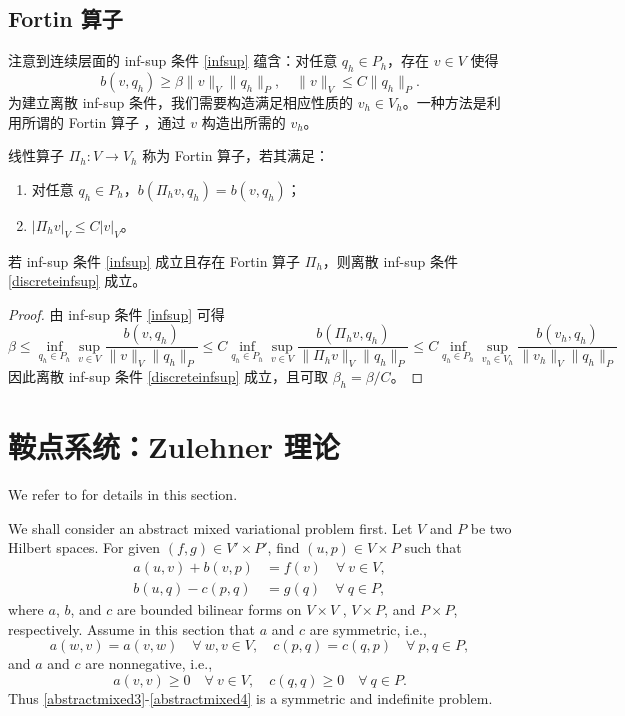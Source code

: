 \subsection{Fortin 算子}
注意到连续层面的 inf-sup 条件 \eqref{infsup} 蕴含：对任意 $q_h\in P_h$，存在 $v \in V$ 使得
$$
b(v, q_h)\geq\beta\|v\|_V\|q_h\|_P, \quad \|v\|_V\leq C\|q_h\|_P.
$$
为建立离散 inf-sup 条件，我们需要构造满足相应性质的 $v_h\in V_h$。一种方法是利用所谓的 Fortin 算子 \cite{Fortin1977}，通过 $v$ 构造出所需的 $v_h$。

\begin{definition}[Fortin 算子]
线性算子 $\Pi_h: V\to V_h$ 称为 Fortin 算子，若其满足：
\begin{enumerate}
\item 对任意 $q_h\in P_h$，$b(\Pi_hv, q_h) = b(v, q_h)$；
\item $|\Pi_hv|_V\leq C|v|_V$。
\end{enumerate}
\end{definition}

\begin{theorem}
若 inf-sup 条件 \eqref{infsup} 成立且存在 Fortin 算子 $\Pi_h$，则离散 inf-sup 条件 \eqref{discreteinfsup} 成立。
\end{theorem}
\begin{proof}
由 inf-sup 条件 \eqref{infsup} 可得
\[
\beta\leq \inf_{q_h\in P_h}\sup_{v\in V}\frac{b(v, q_h)}{\|v\|_V\|q_h\|_P}\leq C\inf_{q_h\in P_h}\sup_{v\in V}\frac{b(\Pi_hv, q_h)}{\|\Pi_hv\|_V\|q_h\|_P}\leq C\inf_{q_h\in P_h}\sup_{v_h\in V_h}\frac{b(v_h, q_h)}{\|v_h\|_V\|q_h\|_P}
\]
因此离散 inf-sup 条件 \eqref{discreteinfsup} 成立，且可取 $\beta_h=\beta/C$。
\end{proof}


\section{鞍点系统：Zulehner 理论}

We refer to \cite{Zulehner2011} for details in this section.

We shall consider an abstract mixed variational
problem first. Let $V$ and $P$ be two Hilbert spaces. For given $(f, g)\in V'\times P'$, find
$(u, p)\in V \times P$ such that
\begin{align}
a(u, v)+ b(v, p) & =f(v) \quad \forall~v\in V, \label{abstractmixed3}\\
b(u, q)-c(p,q) & =g(q)  \quad \forall~q\in P,\label{abstractmixed4}
\end{align}
where $a$, $b$, and $c$ are bounded bilinear forms on $V\times V$ , $V\times P$, and $P\times P$, respectively.
Assume in this section that $a$ and $c$ are symmetric, i.e.,
\[
a(w,v)=a(v,w)\quad\forall~w,v\in V,\quad c(p,q)=c(q,p)\quad\forall~p,q\in P,
\]
and $a$ and $c$ are nonnegative, i.e.,
\[
a(v,v)\geq0\quad\forall~v\in V, \quad c(q,q)\geq0\quad\forall~q\in P.
\]
Thus \eqref{abstractmixed3}-\eqref{abstractmixed4} is a symmetric and indefinite problem.

